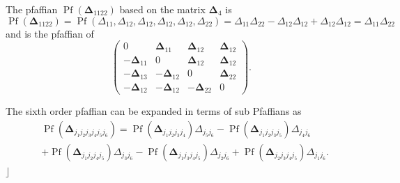 \documentclass[aps, preprint]{revtex4}
\begin{document}
The pfaffian $\ensuremath{\operatorname*{Pf}} \left (\mathbf{\Delta }_{1 1 2 2}\right )$ based on the matrix $\mathbf{\Delta }_{4}$ is
\begin{equation}\ensuremath{\operatorname*{Pf}} \left (\mathbf{\Delta }_{1 1 2 2}\right ) =\ensuremath{\operatorname*{Pf}} \left ( \Delta _{1 1} , \Delta _{1 2} , \Delta _{1 2} , \Delta _{1 2} , \Delta _{1 2} , \Delta _{2 2}\right ) = \Delta _{1 1} \Delta _{2 2} -  \Delta _{1 2} \Delta _{1 2} +  \Delta _{1 2} \Delta _{1 2} =  \Delta _{1 1} \Delta _{2 2}
\end{equation}and is the pfaffian of
\begin{equation}\left (\begin{array}{cccc}0 & \mathbf{\Delta }_{1 1} & \mathbf{\Delta }_{1 2} & \mathbf{\Delta }_{1 2} \\
 -\mathbf{\Delta }_{1 1} & 0 & \mathbf{\Delta }_{1 2} & \mathbf{\Delta }_{1 2} \\
 -\mathbf{\Delta }_{1 3} &  -\mathbf{\Delta }_{1 2} & 0 & \mathbf{\Delta }_{2 2} \\
 -\mathbf{\Delta }_{1 2} &  -\mathbf{\Delta }_{1 2} &  -\mathbf{\Delta }_{2 2} & 0\end{array}\right )\text{.}
\end{equation}

The sixth order pfaffian can be expanded in terms of sub Pfaffians as
\begin{align} & \ensuremath{\operatorname*{Pf}} \left (\mathbf{\Delta }_{j_{1} j_{2} j_{3} j_{4} j_{5} j_{6}}\right ) =\ensuremath{\operatorname*{Pf}} \left (\mathbf{\Delta }_{j_{1} j_{2} j_{3} j_{4}}\right )  \Delta _{j_{5} j_{6}} -\ensuremath{\operatorname*{Pf}} \left (\mathbf{\Delta }_{j_{1} j_{2} j_{3} j_{5}}\right ) \Delta _{j_{4} j_{6}} \nonumber  \\
 &  +\ensuremath{\operatorname*{Pf}} \left (\mathbf{\Delta }_{j_{1} j_{2} j_{4} j_{5}}\right )  \Delta _{j_{3} j_{6}} -\ensuremath{\operatorname*{Pf}} \left (\mathbf{\Delta }_{j_{1} j_{3} j_{4} j_{5}}\right )  \Delta _{j_{2} j_{6}} +\ensuremath{\operatorname*{Pf}} \left (\mathbf{\Delta }_{j_{2} j_{3} j_{4} j_{5}}\right ) \Delta _{j_{1} j_{6}}\text{.}\end{align}$\rfloor $ 
\end{document}
